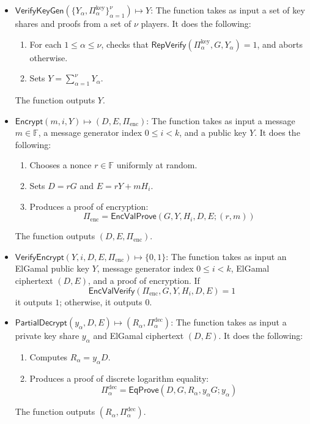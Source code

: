 \documentclass{article}
\newcommand{\F}{\mathbb{F}}
\newcommand{\func}[1]{\mathsf{#1}}
\begin{document}
\begin{itemize}
    \item $\func{VerifyKeyGen}(\{Y_\alpha, \Pi_\alpha^{\text{key}}\}_{\alpha=1}^{\nu}) \mapsto Y$: The function takes as input a set of key shares and proofs from a set of $\nu$ players.
    It does the following:
    \begin{enumerate}
        \item For each $1 \leq \alpha \leq \nu$, checks that $\func{RepVerify}(\Pi_\alpha^{\text{key}}, G, Y_\alpha) = 1$, and aborts otherwise.
        \item Sets $Y = \sum_{\alpha=1}^{\nu} Y_\alpha$.
    \end{enumerate}
    The function outputs $Y$.
    
    \item $\func{Encrypt}(m, i, Y) \mapsto (D, E, \Pi_{\text{enc}})$: The function takes as input a message $m \in \F$, a message generator index $0 \leq i < k$, and a public key $Y$.
    It does the following:
    \begin{enumerate}
        \item Chooses a nonce $r \in \F$ uniformly at random.
        \item Sets $D = rG$ and $E = rY + mH_i$.
        \item Produces a proof of encryption: $$\Pi_{\text{enc}} = \func{EncValProve}(G, Y, H_i, D, E ; (r, m))$$
    \end{enumerate}
    The function outputs $(D, E, \Pi_{\text{enc}})$.
    
    \item $\func{VerifyEncrypt}(Y, i, D, E, \Pi_{\text{enc}}) \mapsto \{0, 1\}$: The function takes as input an ElGamal public key $Y$, message generator index $0 \leq i < k$, ElGamal ciphertext $(D, E)$, and a proof of encryption.
    If $$\func{EncValVerify}(\Pi_{\text{enc}}, G, Y, H_i, D, E) = 1$$ it outputs $1$; otherwise, it outputs $0$.
    
    \item $\func{PartialDecrypt}(y_\alpha, D, E) \mapsto (R_\alpha, \Pi_\alpha^{\text{dec}})$: The function takes as input a private key share $y_\alpha$ and ElGamal ciphertext $(D, E)$.
    It does the following:
    \begin{enumerate}
        \item Computes $R_\alpha = y_\alpha D$.
        \item Produces a proof of discrete logarithm equality: $$\Pi_\alpha^{\text{dec}} = \func{EqProve}(D, G, R_\alpha, y_\alpha G ; y_\alpha)$$
    \end{enumerate}
    The function outputs $(R_\alpha, \Pi_\alpha^{\text{dec}})$.
    

\end{itemize}
\end{document}
